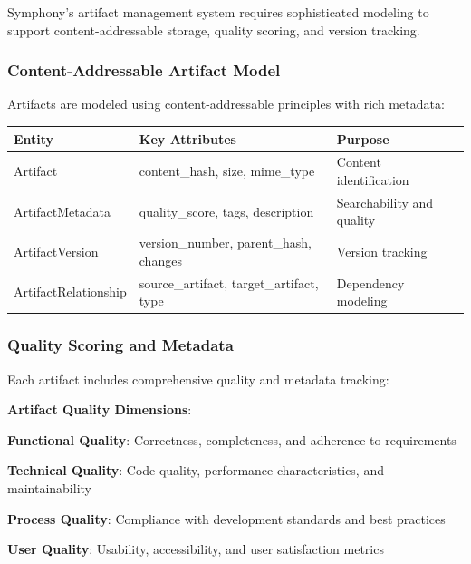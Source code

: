 Symphony's artifact management system requires sophisticated modeling to support content-addressable storage, quality scoring, and version tracking.

\subsubsection*{Content-Addressable Artifact Model}

Artifacts are modeled using content-addressable principles with rich metadata:

\begin{center}
\begin{tabular}{@{}lll@{}}
\toprule
\textbf{Entity} & \textbf{Key Attributes} & \textbf{Purpose} \\
\midrule
Artifact & content\_hash, size, mime\_type & Content identification \\
ArtifactMetadata & quality\_score, tags, description & Searchability and quality \\
ArtifactVersion & version\_number, parent\_hash, changes & Version tracking \\
ArtifactRelationship & source\_artifact, target\_artifact, type & Dependency modeling \\
\bottomrule
\end{tabular}
\end{center}

\subsubsection*{Quality Scoring and Metadata}

Each artifact includes comprehensive quality and metadata tracking:

\begin{successbox}
\textbf{Artifact Quality Dimensions}:
\begin{compactlist}
    \item \textbf{Functional Quality}: Correctness, completeness, and adherence to requirements
    \item \textbf{Technical Quality}: Code quality, performance characteristics, and maintainability
    \item \textbf{Process Quality}: Compliance with development standards and best practices
    \item \textbf{User Quality}: Usability, accessibility, and user satisfaction metrics
\end{compactlist}
\end{successbox}

